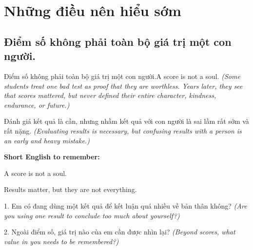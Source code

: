\chapter{Những điều nên hiểu sớm}

\section{Điểm số không phải toàn bộ giá trị một con người.}
\begin{truyen}{Điểm số không phải toàn bộ giá trị một con người.}{A score is not a soul.}
\textit{(Some students treat one bad test as proof that they are worthless. Years later, they see that scores mattered, but never defined their entire character, kindness, endurance, or future.)}
\end{truyen}
\begin{baihoc}
Đánh giá kết quả là cần, nhưng nhầm kết quả với con người là sai lầm rất sớm và rất nặng.
\textit{(Evaluating results is necessary, but confusing results with a person is an early and heavy mistake.)}
\end{baihoc}
\begin{ghinhoanh}
\textbf{Short English to remember:}

A score is not a soul.

Results matter, but they are not everything.
\end{ghinhoanh}
\begin{tuhocnhanh}
1. Em có đang dùng một kết quả để kết luận quá nhiều về bản thân không? \textit{(Are you using one result to conclude too much about yourself?)}

2. Ngoài điểm số, giá trị nào của em cần được nhìn lại? \textit{(Beyond scores, what value in you needs to be remembered?)}
\end{tuhocnhanh}
\ngancach

